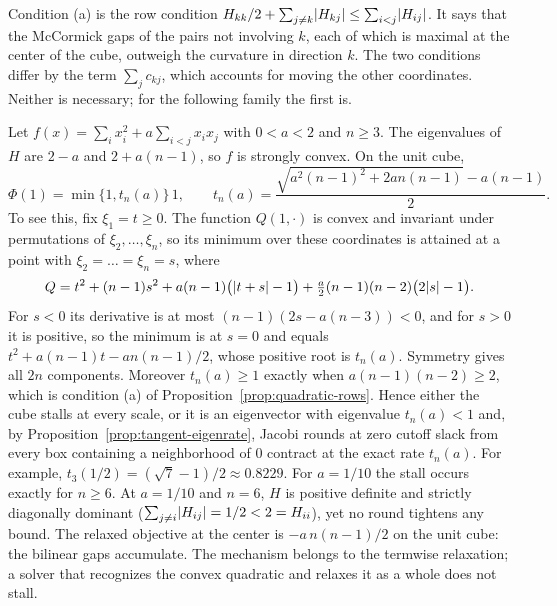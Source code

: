 Condition (a) is the row condition
$H_{kk}/2+\sum_{j\ne k}\lvert H_{kj}\rvert\le\sum_{i<j}\lvert H_{ij}\rvert$. It says that
the McCormick gaps of the pairs not involving $k$, each of which is maximal
at the center of the cube, outweigh the curvature in direction $k$. The two
conditions differ by the term $\sum_jc_{kj}$, which accounts for moving the
other coordinates. Neither is necessary; for the following family the
first is.

\begin{example}\label{ex:many-term}
Let $f(x)=\sum_ix_i^2+a\sum_{i<j}x_ix_j$ with $0<a<2$ and $n\ge3$. The
eigenvalues of $H$ are $2-a$ and $2+a(n-1)$, so $f$ is strongly convex. On
the unit cube,
\[
  \Phi(1)=\min\{1,t_n(a)\}\,1,\qquad
  t_n(a)=\frac{\sqrt{a^2(n-1)^2+2an(n-1)}-a(n-1)}{2}.
\]
To see this, fix $\xi_1=t\ge0$. The function $Q(1,\cdot)$ is convex and
invariant under permutations of $\xi_2,\dots,\xi_n$, so its minimum over
these coordinates is attained at a point with $\xi_2=\dots=\xi_n=s$, where
\[
  Q=t^2+(n-1)s^2+a(n-1)\bigl(\lvert t+s\rvert-1\bigr)
   +\tfrac{a}{2}(n-1)(n-2)\bigl(2\lvert s\rvert-1\bigr).
\]
For $s<0$ its derivative is at most $(n-1)(2s-a(n-3))<0$, and for $s>0$ it
is positive, so the minimum is at $s=0$ and equals
$t^2+a(n-1)t-an(n-1)/2$, whose positive root is $t_n(a)$. Symmetry gives
all $2n$ components. Moreover $t_n(a)\ge1$ exactly when
$a(n-1)(n-2)\ge2$, which is condition (a) of
Proposition~\ref{prop:quadratic-rows}. Hence either the cube stalls at every
scale, or it is an eigenvector with eigenvalue $t_n(a)<1$ and, by
Proposition~\ref{prop:tangent-eigenrate}, Jacobi rounds at zero cutoff slack
from every box containing a neighborhood of $0$ contract at the exact rate
$t_n(a)$. For
example, $t_3(1/2)=(\sqrt7-1)/2\approx0.8229$. For $a=1/10$ the stall occurs
exactly for $n\ge6$. At $a=1/10$ and $n=6$, $H$ is positive definite and
strictly diagonally dominant ($\sum_{j\ne i}\lvert H_{ij}\rvert=1/2<2=H_{ii}$), yet
no round tightens any bound. The relaxed objective at the center is
$-a\,n(n-1)/2$ on the unit cube: the bilinear gaps accumulate. The
mechanism belongs to the termwise relaxation; a solver that recognizes the
convex quadratic and relaxes it as a whole does not stall.
\end{example}

